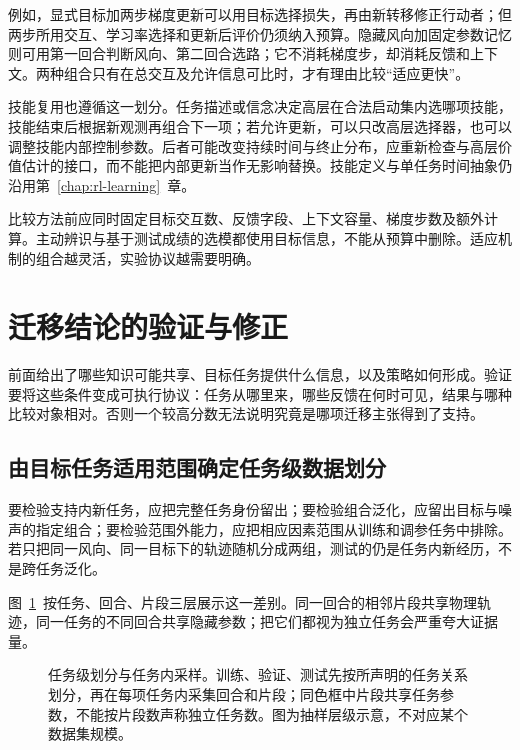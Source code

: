 例如，显式目标加两步梯度更新可以用目标选择损失，再由新转移修正行动者；但两步所用交互、学习率选择和更新后评价仍须纳入预算。隐藏风向加固定参数记忆则可用第一回合判断风向、第二回合选路；它不消耗梯度步，却消耗反馈和上下文。两种组合只有在总交互及允许信息可比时，才有理由比较“适应更快”。

技能复用也遵循这一划分。任务描述或信念决定高层在合法启动集内选哪项技能，技能结束后根据新观测再组合下一项；若允许更新，可以只改高层选择器，也可以调整技能内部控制参数。后者可能改变持续时间与终止分布，应重新检查与高层价值估计的接口，而不能把内部更新当作无影响替换。技能定义与单任务时间抽象仍沿用第~\ref{chap:rl-learning}~章。

比较方法前应同时固定目标交互数、反馈字段、上下文容量、梯度步数及额外计算。主动辨识与基于测试成绩的选模都使用目标信息，不能从预算中删除。适应机制的组合越灵活，实验协议越需要明确。

\section{迁移结论的验证与修正}
\label{sec:rl-transfer-validation}

前面给出了哪些知识可能共享、目标任务提供什么信息，以及策略如何形成。验证要将这些条件变成可执行协议：任务从哪里来，哪些反馈在何时可见，结果与哪种比较对象相对。否则一个较高分数无法说明究竟是哪项迁移主张得到了支持。

\subsection{由目标任务适用范围确定任务级数据划分}
\label{sec:rl-transfer-split}

要检验支持内新任务，应把完整任务身份留出；要检验组合泛化，应留出目标与噪声的指定组合；要检验范围外能力，应把相应因素范围从训练和调参任务中排除。若只把同一风向、同一目标下的轨迹随机分成两组，测试的仍是任务内新经历，不是跨任务泛化。

图~\ref{fig:rl-transfer-split}~按任务、回合、片段三层展示这一差别。同一回合的相邻片段共享物理轨迹，同一任务的不同回合共享隐藏参数；把它们都视为独立任务会严重夸大证据量。

\begin{figure}[htbp]
 \centering
 
 \caption{任务级划分与任务内采样。训练、验证、测试先按所声明的任务关系划分，再在每项任务内采集回合和片段；同色框中片段共享任务参数，不能按片段数声称独立任务数。图为抽样层级示意，不对应某个数据集规模。}
 \label{fig:rl-transfer-split}
\end{figure}


